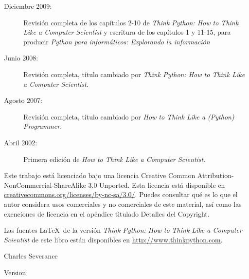 \begin{latexonly}
{\begin{description}
\item[Diciembre 2009:] Revisión completa de los capítulos 2-10 de
\emph{Think Python: How to Think Like
a Computer Scientist}
y escritura de los capítulos 1 y 11-15, para
producir 
\emph{Python para informáticos: Explorando la información}

\item[Junio 2008:] Revisión completa, título cambiado por
\emph{Think Python: How to Think Like
a Computer Scientist}.

\item[Agosto 2007:] Revisión completa, título cambiado por
\emph{How to Think Like a (Python) Programmer}.

\item[Abril 2002:] Primera edición de \emph{How to Think Like
a Computer Scientist}.

\end{description}

\vspace{0.2in}

Este trabajo está licenciado bajo una licencia
Creative Common
Attribution-NonCommercial-ShareAlike 3.0 Unported.
Esta licencia está
disponible en
\url{creativecommons.org/licenses/by-nc-sa/3.0/}. Puedes
consultar qué es lo que el autor considera usos comerciales y no comerciales
de este material, así como las exenciones de licencia
en el apéndice titulado Detalles del Copyright.

Las fuentes \LaTeX\ de la versión 
\emph{Think Python: How to Think Like
	a Computer Scientist}
de este libro están disponibles en
\url{http://www.thinkpython.com}.

\vspace{0.2in}

} %

\end{latexonly}



\begin{htmlonly}


{\Large \thetitle}

{\large 
Charles Severance}

Version \theversion

\setcounter{chapter}{-1}

\end{htmlonly}
